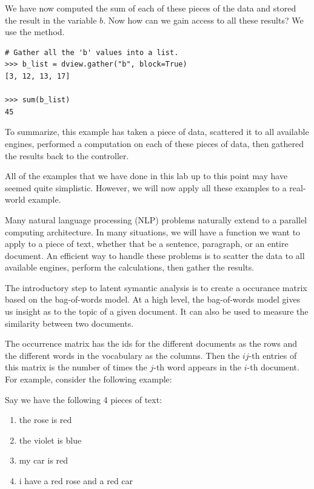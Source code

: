 We have now computed the sum of each of these pieces of the data and stored the result in the variable $b$. Now how can we gain access to all these results? We use the  method.

\begin{lstlisting}
# Gather all the 'b' values into a list.
>>> b_list = dview.gather("b", block=True)
[3, 12, 13, 17]

>>> sum(b_list)
45
\end{lstlisting}

To summarize, this example has taken a piece of data, scattered it to all available engines, performed a computation on each of these pieces of data, then gathered the results back to the controller.

\begin{problem}
All of the examples that we have done in this lab up to this point may have seemed quite simplistic. However, we will now apply all these examples to a real-world example.

Many natural language processing (NLP) problems naturally extend to a parallel computing architecture. In many situations, we will have a function we want to apply to a piece of text, whether that be a sentence, paragraph, or an entire document. An efficient way to handle these problems is to scatter the data to all available engines, perform the calculations, then gather the results.

The introductory step to latent symantic analysis is to create a occurance matrix based on the bag-of-words model. At a high level, the bag-of-words model gives us insight as to the topic of a given document. It can also be used to measure the similarity between two documents.

The occurrence matrix has the ids for the different documents as the rows and the different words in the vocabulary as the columns. Then the $ij$-th entries of this matrix is the number of times the $j$-th word appears in the $i$-th document. For example, consider the following example:

Say we have the following 4 pieces of text:
\begin{enumerate}
    \item the rose is red
    \item the violet is blue
    \item my car is red
    \item i have a red rose and a red car
\end{enumerate}


\end{problem}
